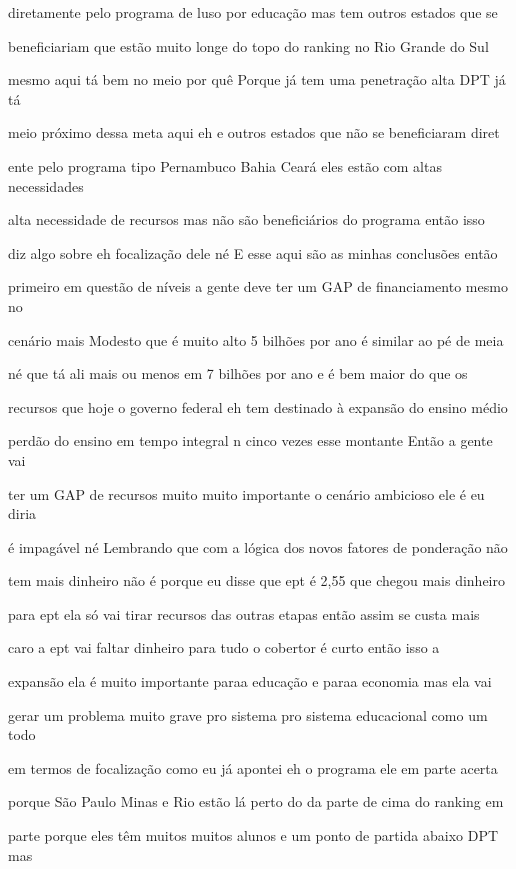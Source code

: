 \documentclass[a4paper,12pt]{article}
\begin{document}
diretamente pelo programa de luso por educação mas tem outros estados que se

beneficiariam que estão muito longe do topo do ranking no Rio Grande do Sul

mesmo aqui tá bem no meio por quê Porque já tem uma penetração alta DPT já tá

meio próximo dessa meta aqui eh e outros estados que não se beneficiaram diret

ente pelo programa tipo Pernambuco Bahia Ceará eles estão com altas necessidades

alta necessidade de recursos mas não são beneficiários do programa então isso

diz algo sobre eh focalização dele né E esse aqui são as minhas conclusões então

primeiro em questão de níveis a gente deve ter um GAP de financiamento mesmo no

cenário mais Modesto que é muito alto 5 bilhões por ano é similar ao pé de meia

né que tá ali mais ou menos em 7 bilhões por ano e é bem maior do que os

recursos que hoje o governo federal eh tem destinado à expansão do ensino médio

perdão do ensino em tempo integral n cinco vezes esse montante Então a gente vai

ter um GAP de recursos muito muito importante o cenário ambicioso ele é eu diria

é impagável né Lembrando que com a lógica dos novos fatores de ponderação não

tem mais dinheiro não é porque eu disse que ept é 2,55 que chegou mais dinheiro

para ept ela só vai tirar recursos das outras etapas então assim se custa mais

caro a ept vai faltar dinheiro para tudo o cobertor é curto então isso a

expansão ela é muito importante paraa educação e paraa economia mas ela vai

gerar um problema muito grave pro sistema pro sistema educacional como um todo

em termos de focalização como eu já apontei eh o programa ele em parte acerta

porque São Paulo Minas e Rio estão lá perto do da parte de cima do ranking em

parte porque eles têm muitos muitos alunos e um ponto de partida abaixo DPT mas
\end{document}
